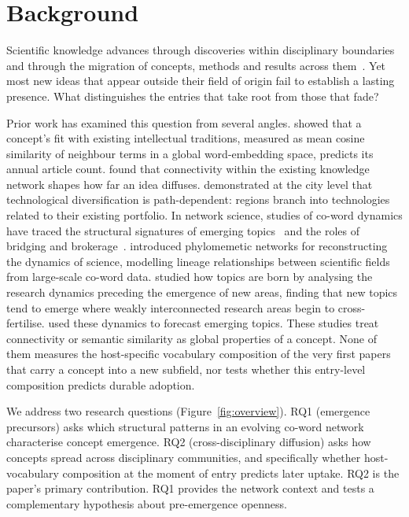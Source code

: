 \documentclass[11pt,letterpaper]{article}
\begin{document}
\section{Background}
\label{sec:background}

Scientific knowledge advances through discoveries within disciplinary boundaries and through the
migration of concepts, methods and results across them~\citep{Uzzi2013, Wang2017}. Yet most new ideas that appear
outside their field of origin fail to establish a lasting presence. What distinguishes the entries that take root
from those that fade?

Prior work has examined this question from several angles. \citet{Cheng2023} showed that a concept's fit with
existing intellectual traditions, measured as mean cosine similarity of neighbour terms in a global word-embedding
space, predicts its annual article count. \citet{Deichmann2020} found that connectivity within the existing
knowledge network shapes how far an idea diffuses. \citet{Boschma2014} demonstrated at the city level that
technological diversification is path-dependent: regions branch into technologies related to their existing
portfolio. In network science, studies of co-word dynamics have traced the structural signatures of emerging
topics~\citep{Chen2009} and the roles of bridging and brokerage~\citep{Burt2004, Guimera2005a}.
\citet{Chavalarias2013} introduced phylomemetic networks for reconstructing the dynamics of science,
modelling lineage relationships between scientific fields from large-scale co-word data.
\citet{Salatino2017} studied how topics are born by analysing the research dynamics preceding
the emergence of new areas, finding that new topics tend to emerge where weakly interconnected research areas
begin to cross-fertilise. \citet{Salatino2018augur} used these dynamics to forecast emerging topics.
These studies treat connectivity or semantic similarity as global properties of a concept. None of them measures
the host-specific vocabulary composition of the very first papers that carry a concept into a new subfield, nor
tests whether this entry-level composition predicts durable adoption.

We address two research questions (Figure~\ref{fig:overview}). RQ1 (emergence precursors) asks which structural
patterns in an evolving co-word network characterise concept emergence. RQ2 (cross-disciplinary diffusion) asks
how concepts spread across disciplinary communities, and specifically whether host-vocabulary composition at the
moment of entry predicts later uptake. RQ2 is the paper's primary contribution. RQ1 provides the network context
and tests a complementary hypothesis about pre-emergence openness.
\end{document}
